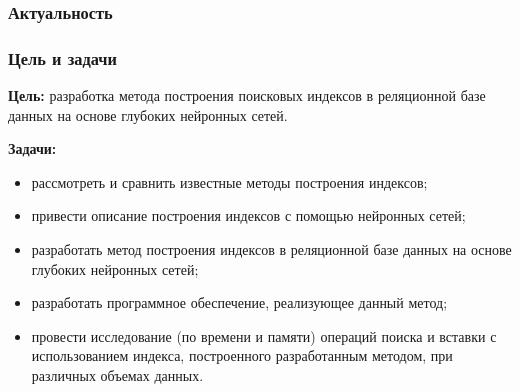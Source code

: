 \documentclass[8pt,table]{bmstu-pr}
\begin{document}

\begin{frame}
    \frametitle{Актуальность}

\end{frame}

\begin{frame}
    \frametitle{Цель и задачи}

    {
    \fontsize{22pt}{22pt}\selectfont
    \textbf{Цель:} разработка метода построения поисковых индексов в реляционной
    базе данных на основе глубоких нейронных сетей.

    \vspace{2mm}
    \textbf{Задачи:}
    \begin{itemize}
        \item рассмотреть и сравнить известные методы построения индексов;
        \item привести описание построения индексов с помощью нейронных сетей;
        \item разработать метод построения индексов в реляционной базе
            данных на основе глубоких нейронных сетей;
        \item разработать программное обеспечение, реализующее данный метод;
        \item провести исследование (по времени и памяти) операций поиска и вставки
            с использованием индекса, построенного разработанным методом, при
            различных объемах данных.
    \end{itemize}
    }
\end{frame}
\end{document}
